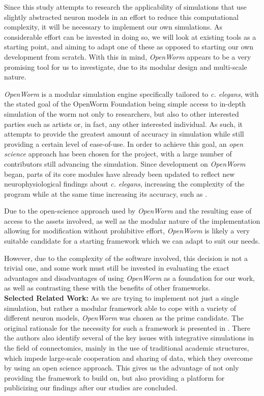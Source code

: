 \documentclass[a4paper,11pt]{article}
\begin{document}
Since this study attempts to research the applicability of simulations that use slightly abstracted neuron models in an effort to reduce this computational complexity, it will be necessary to implement our own simulations. As considerable effort can be invested in doing so, we will look at existing tools as a starting point, and aiming to adapt one of these as opposed to starting our own development from scratch. With this in mind, \emph{OpenWorm} \citep{Szigeti2014} appears to be a very promising tool for us to investigate, due to its modular design and multi-scale nature.

\emph{OpenWorm} is a modular simulation engine specifically tailored to \emph{c. elegans}, with the stated goal of the OpenWorm Foundation being simple access to in-depth simulation of the worm not only to researchers, but also to other interested parties such as artists or, in fact, any other interested individual. As such, it attempts to provide the greatest amount of accuracy in simulation while still providing a certain level of ease-of-use. In order to achieve this goal, an \emph{open science} \citep{nielsen2012reinventing} approach has been chosen for the project, with a large number of contributors still advancing the simulation. Since development on \emph{OpenWorm} began, parts of its core modules have already been updated to reflect new neurophysiological findings about \emph{c. elegans}, increasing the complexity of the program while at the same time increasing its accuracy, such as \citep{M.2013}.

Due to the open-science approach used by \emph{OpenWorm} and the resulting ease of access to the assets involved, as well as the modular nature of the implementation allowing for modification without prohibitive effort, \emph{OpenWorm} is likely a very suitable candidate for a starting framework which we can adapt to suit our needs.

However, due to the complexity of the software involved, this decision is not a trivial one, and some work must still be invested in evaluating the exact advantages and disadvantages of using \emph{OpenWorm} as a foundation for our work, as well as contrasting these with the benefits of other frameworks.
\\[0,2cm]

\textbf{Selected Related Work:}
As we are trying to implement not just a single simulation, but rather a modular framework able to cope with a variety of different neuron models, \emph{OpenWorm} was chosen as the prime candidate. The original rationale for the necessity for such a framework is presented in \citep{Szigeti2014}. There the authors also identify several of the key issues with integrative simulations in the field of connectomics, mainly in the use of traditional academic structures, which impede large-scale cooperation and sharing of data, which they overcome by using an open science approach. This gives us the advantage of not only providing the framework to build on, but also providing a platform for publicizing our findings after our studies are concluded.
\end{document}

